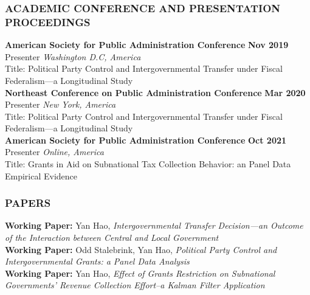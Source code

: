 \subsubsection*{ACADEMIC CONFERENCE AND PRESENTATION PROCEEDINGS}
\noindent \textbf{American Society for Public Administration Conference} \hfill \textbf{Nov 2019} \\
Presenter \hfill \textit{Washington D.C, America}\\
Title: Political Party Control and Intergovernmental Transfer under Fiscal Federalism—a Longitudinal Study
\\[12pt]
\noindent \textbf{Northeast Conference on Public Administration Conference} \hfill \textbf{Mar 2020} \\
Presenter \hfill \textit{New York, America}\\
Title: Political Party Control and Intergovernmental Transfer under Fiscal Federalism—a Longitudinal Study
\\[12pt]
\noindent \textbf{American Society for Public Administration Conference} \hfill \textbf{Oct 2021} \\
Presenter \hfill \textit{Online, America}\\
Title: Grants in Aid on Subnational Tax Collection Behavior: an Panel Data Empirical Evidence
\\[8pt]
% 

\subsubsection*{PAPERS}
\noindent \textbf{Working Paper:} Yan Hao, \textit{Intergovernmental Transfer Decision---an Outcome of the Interaction between Central and Local Government}
\\[12pt]
\noindent \textbf{Working Paper:} Odd Stalebrink, Yan Hao, \textit{Political Party Control and Intergovernmental Grants: a Panel Data Analysis}
\\[12pt]
\noindent \textbf{Working Paper:} Yan Hao, \textit{Effect of Grants Restriction on Subnational Governments' Revenue Collection Effort--a Kalman Filter Application}

